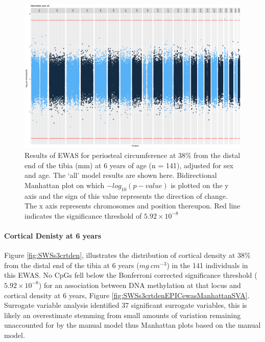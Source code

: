 \documentclass[
]{book}
\begin{document}
\begin{figure}

{\centering \includegraphics[width=0.8\linewidth]{figs/SWSs3pericEPICewasManhattanAll} 

}

\caption{Results of EWAS for periosteal circumference at 38\% from the distal end of the tibia (mm) at 6 years of age (n = 141), adjusted for sex and age. The `all' model results are shown here. Bidirectional Manhattan plot on which \(-log_{10}(p-value)\) is plotted on the y axis and the sign of this value represents the direction of change. The x axis represents chromosomes and position thereupon. Red line indicates the significance threshold of \(5.92\times10^{-8}\)}\label{fig:SWSs3pericEPICewasManhattanSVA}
\end{figure}



\hypertarget{cortical-denisty-at-6-years}{%
\paragraph{Cortical Denisty at 6 years}\label{cortical-denisty-at-6-years}}

Figure \ref{fig:SWSs3crtden}, illustrates the distribution of cortical density at 38\% from the distal end of the tibia at 6 years (\(mg~cm^{-3}\)) in the 141 individuals in this EWAS.
No CpGs fell below the Bonferroni corrected significance threshold (\(5.92\times10^{-8}\)) for an association between DNA methylation at that locus and cortical density at 6 years, Figure \ref{fig:SWSs3crtdenEPICewasManhattanSVA}.
Surrogate variable analysis identified 37 significant surrogate variables, this is likely an overestimate stemming from small amounts of variation remaining unaccounted for by the manual model thus Manhattan plots based on the manual model.
\end{document}
